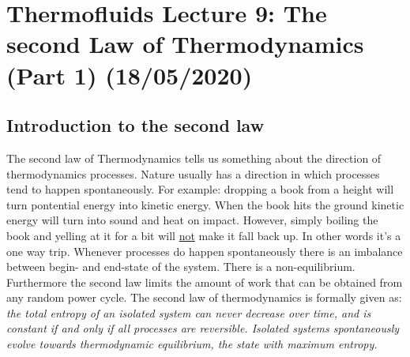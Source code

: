 \documentclass[11pt, a4paper]{article}
\begin{document}
\setcounter{section}{8}
\setcounter{equation}{0}
\section{Thermofluids Lecture 9: The second Law of Thermodynamics (Part 1) (18/05/2020)}


\subsection{Introduction to the second law}
The second law of Thermodynamics tells us something about the direction of thermodynamics processes. Nature usually has a direction in which processes tend to happen spontaneously. For example: dropping a book from a height will turn pontential energy into kinetic energy. When the book hits the ground kinetic energy will turn into sound and heat on impact. However, simply boiling the book and yelling at it for a bit will \underline{not} make it fall back up. In other words it's a one way trip. Whenever processes do happen spontaneously there is an imbalance between begin- and end-state of the system. There is a non-equilibrium. Furthermore the second law limits the amount of work that can be obtained from any random power cycle. The second law of thermodynamics is formally given as: \newline
\textit{the total entropy of an isolated system can never decrease over time, and is constant if and only if all processes are reversible. Isolated systems spontaneously evolve towards thermodynamic equilibrium, the state with maximum entropy.}
\end{document}
